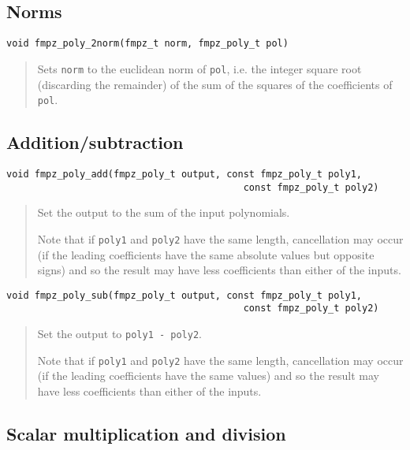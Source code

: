 \documentclass[a4paper,10pt]{article}
\newcommand{\code}{\lstinline}
\begin{document}
\subsection{Norms}

\begin{lstlisting}
void fmpz_poly_2norm(fmpz_t norm, fmpz_poly_t pol)

\end{lstlisting}
\begin{quote}
Sets \code{norm} to the euclidean norm of \code{pol}, i.e. the integer square root (discarding the remainder) of the sum of the squares of the coefficients of \code{pol}.
\end{quote}

\subsection{Addition/subtraction}

\begin{lstlisting}
void fmpz_poly_add(fmpz_poly_t output, const fmpz_poly_t poly1, 
                                          const fmpz_poly_t poly2) 
\end{lstlisting}
\begin{quote}
Set the output to the sum of the input polynomials. 

Note that if \code{poly1} and \code{poly2} have the same length, cancellation may occur (if the leading coefficients have the same absolute values but opposite signs) and so the result may have less coefficients than either of the inputs. 
\end{quote}

\begin{lstlisting}
void fmpz_poly_sub(fmpz_poly_t output, const fmpz_poly_t poly1, 
                                          const fmpz_poly_t poly2) 
\end{lstlisting}
\begin{quote}
Set the output to \code{poly1 - poly2}. 

Note that if \code{poly1} and \code{poly2} have the same length, cancellation may occur (if the leading coefficients have the same values) and so the result may have less coefficients than either of the inputs. 
\end{quote}

\subsection{Scalar multiplication and division}
\end{document}
